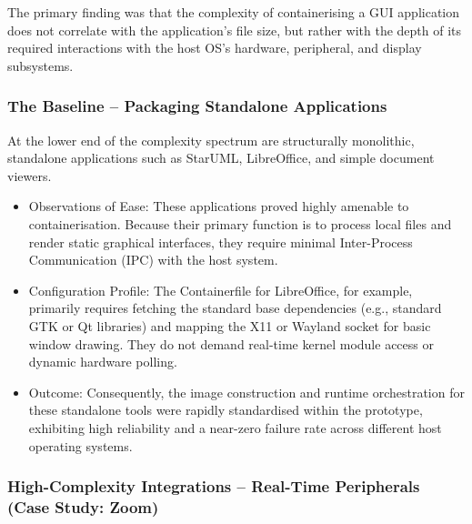 \documentclass[journal,onecolumn]{IEEEtran}
\begin{document}
The primary finding was that the complexity of containerising a GUI application does not correlate with the application's file size, but rather with the depth of its required interactions with the host OS's hardware, peripheral, and display subsystems.

\subsubsection{The Baseline – Packaging Standalone Applications}

At the lower end of the complexity spectrum are structurally monolithic, standalone applications such as StarUML, LibreOffice, and simple document viewers.
\begin{itemize}
    \item Observations of Ease: These applications proved highly amenable to containerisation. Because their primary function is to process local files and render static graphical interfaces, they require minimal Inter-Process Communication (IPC) with the host system.
    \item Configuration Profile: The Containerfile for LibreOffice, for example, primarily requires fetching the standard base dependencies (e.g., standard GTK or Qt libraries) and mapping the X11 or Wayland socket for basic window drawing. They do not demand real-time kernel module access or dynamic hardware polling.
    \item Outcome: Consequently, the image construction and runtime orchestration for these standalone tools were rapidly standardised within the prototype, exhibiting high reliability and a near-zero failure rate across different host operating systems.
\end{itemize}

\subsubsection{High-Complexity Integrations – Real-Time Peripherals (Case Study: Zoom)}
\end{document}
